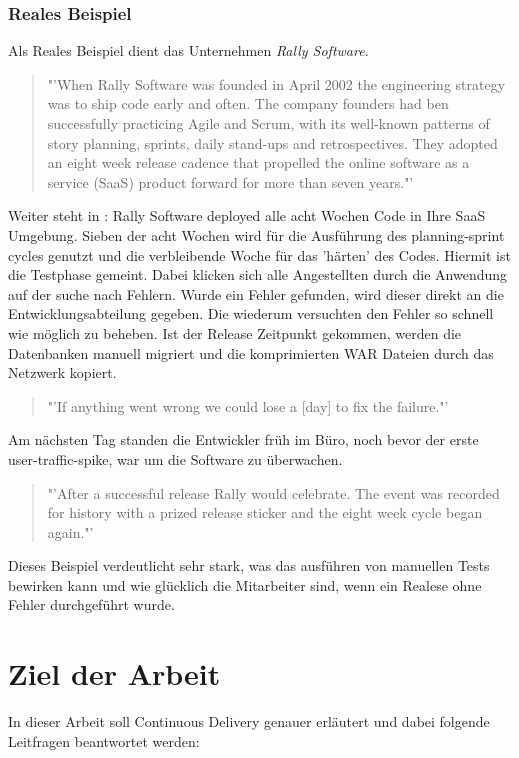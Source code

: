 \subsubsection*{Reales Beispiel}
Als Reales Beispiel dient das Unternehmen \textit{Rally Software}.
\begin{quote}
"'When Rally Software was founded in April 2002 the engineering strategy was to ship code early and often. The company founders had ben successfully practicing Agile and Scrum, with its well-known patterns of story planning, sprints, daily stand-ups and retrospectives. They adopted an eight week release cadence that propelled the online software as a service (SaaS) product forward for more than seven years."'\cite{RallySofware2013}
\end{quote}
Weiter steht in \cite{RallySofware2013}:
Rally Software deployed alle acht Wochen Code in Ihre SaaS Umgebung. Sieben der acht Wochen wird für die Ausführung des planning-sprint cycles genutzt und die verbleibende Woche für das 'härten' des Codes. Hiermit ist die Testphase gemeint. Dabei klicken sich alle Angestellten durch die Anwendung auf der suche nach Fehlern. Wurde ein Fehler gefunden, wird dieser direkt an die Entwicklungsabteilung gegeben. Die wiederum versuchten den Fehler so schnell wie möglich zu beheben. Ist der Release Zeitpunkt gekommen, werden die Datenbanken manuell migriert und die komprimierten WAR Dateien durch das Netzwerk kopiert.
\begin{quote}
	"'If anything went wrong we could lose a [day] to fix the failure."'\cite{RallySofware2013}
\end{quote}
Am nächsten Tag standen die Entwickler früh im Büro, noch bevor der erste user-traffic-spike, war um die Software zu überwachen.
\begin{quote}
	"'After a successful release Rally would celebrate. The event was recorded for history with a prized release sticker and the eight week cycle began again."'\cite{RallySofware2013}
\end{quote}
Dieses Beispiel verdeutlicht sehr stark, was das ausführen von manuellen Tests bewirken kann und wie glücklich die Mitarbeiter sind, wenn ein Realese ohne Fehler durchgeführt wurde.

\section{Ziel der Arbeit}
\label{sec:zielDerArbeit}
In dieser Arbeit soll Continuous Delivery genauer erläutert und dabei folgende Leitfragen beantwortet werden:


